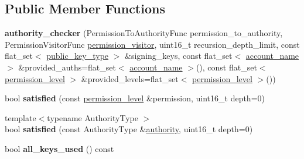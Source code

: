 \subsection*{Public Member Functions}
\begin{DoxyCompactItemize}
\item 
\mbox{\label{classaacio_1_1chain_1_1authority__checker_a0f187c435ba996a0aa4aa32c34abe8d2}} 
{\bfseries authority\+\_\+checker} (Permission\+To\+Authority\+Func permission\+\_\+to\+\_\+authority, Permission\+Visitor\+Func \mbox{\hyperlink{classaacio_1_1chain_1_1permission__visitor}{permission\+\_\+visitor}}, uint16\+\_\+t recursion\+\_\+depth\+\_\+limit, const flat\+\_\+set$<$ \mbox{\hyperlink{classfc_1_1crypto_1_1public__key}{public\+\_\+key\+\_\+type}} $>$ \&signing\+\_\+keys, const flat\+\_\+set$<$ \mbox{\hyperlink{structaacio_1_1chain_1_1name}{account\+\_\+name}} $>$ \&provided\+\_\+auths=flat\+\_\+set$<$ \mbox{\hyperlink{structaacio_1_1chain_1_1name}{account\+\_\+name}} $>$(), const flat\+\_\+set$<$ \mbox{\hyperlink{structaacio_1_1chain_1_1permission__level}{permission\+\_\+level}} $>$ \&provided\+\_\+levels=flat\+\_\+set$<$ \mbox{\hyperlink{structaacio_1_1chain_1_1permission__level}{permission\+\_\+level}} $>$())
\item 
\mbox{\label{classaacio_1_1chain_1_1authority__checker_a61de96d2523e08cd772101d68ca51957}} 
bool {\bfseries satisfied} (const \mbox{\hyperlink{structaacio_1_1chain_1_1permission__level}{permission\+\_\+level}} \&permission, uint16\+\_\+t depth=0)
\item 
\mbox{\label{classaacio_1_1chain_1_1authority__checker_a7bb9c8ba6c36e0aac366dfec805b7b57}} 
{\footnotesize template$<$typename Authority\+Type $>$ }\\bool {\bfseries satisfied} (const Authority\+Type \&\mbox{\hyperlink{structaacio_1_1chain_1_1authority}{authority}}, uint16\+\_\+t depth=0)
\item 
\mbox{\label{classaacio_1_1chain_1_1authority__checker_a5f2b113643a657706527737df561af18}} 
bool {\bfseries all\+\_\+keys\+\_\+used} () const
\item 
\mbox{\label{classaacio_1_1chain_1_1authority__checker_aabe3b0cc1bcb68f801097c8c50c23373}} 

\end{DoxyCompactItemize}
